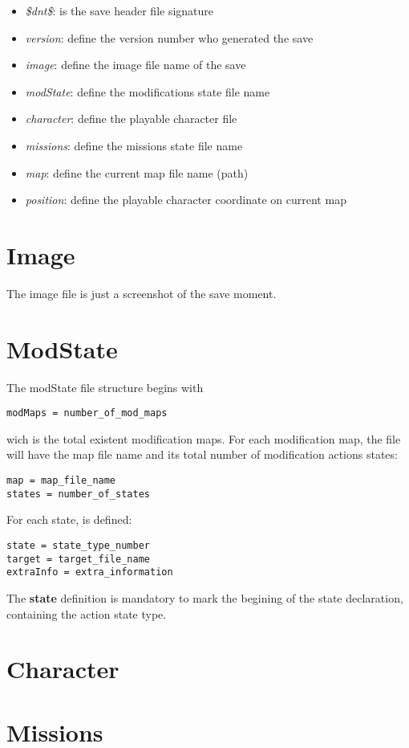 \documentclass[letterpaper,12pt]{article}
\begin{document}
\begin{itemize}
\item{{\it \$dnt\$}: is the save header file signature}
\item{{\it version}: define the version number who generated the save}
\item{{\it image}: define the image file name of the save}
\item{{\it modState}: define the modifications state file name}
\item{{\it character}: define the playable character file}
\item{{\it missions}: define the missions state file name}
\item{{\it map}: define the current map file name (path)}
\item{{\it position}: define the playable character coordinate on current map}
\end{itemize}

\section{Image}
The image file is just a screenshot of the save moment.

\section{ModState}

The modState file structure begins with

\begin{verbatim}
modMaps = number_of_mod_maps
\end{verbatim}

wich is the total existent modification maps. For each modification map,
the file will have the map file name and its total number of modification
actions states:

\begin{verbatim}
map = map_file_name
states = number_of_states
\end{verbatim}

For each state, is defined:

\begin{verbatim}
state = state_type_number
target = target_file_name
extraInfo = extra_information
\end{verbatim}


The {\bf state} definition is mandatory to mark the begining of the state
declaration, containing the action state type.

\section{Character}

\section{Missions}
\end{document}
